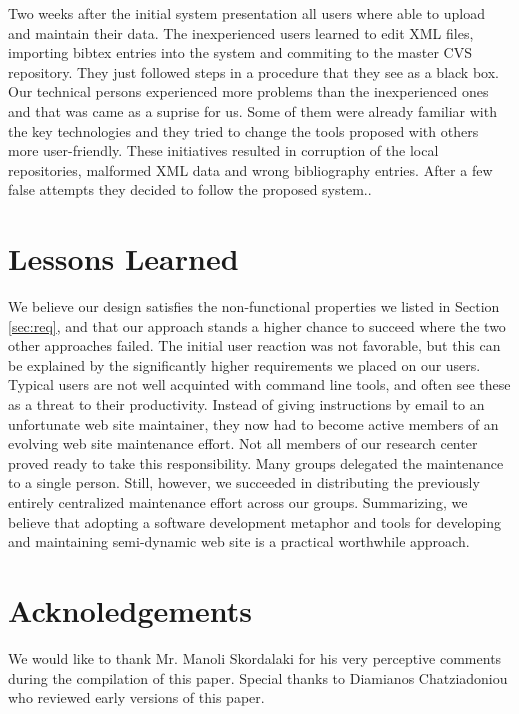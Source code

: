 \documentclass[10pt]{article}
\begin{document}
Two weeks after the initial system presentation all users where able to upload 
and maintain their data. The inexperienced users learned to edit XML files,
importing bibtex entries into the system and commiting to the master CVS repository. 
They just followed steps in a procedure that they see as a black box. 
Our technical persons experienced more problems than the inexperienced ones 
and that was came as a suprise for us. Some of them were already familiar 
with the key technologies and they tried to change the tools proposed with others more user-friendly. 
These initiatives resulted in corruption of the local repositories, malformed XML data and wrong bibliography entries.
After a few false attempts they decided to follow the proposed system..

\section{Lessons Learned}
\label{sec:concl}
We believe our design satisfies the non-functional properties
we listed in Section \ref{sec:req},
and that our approach stands a higher chance to succeed where the
two other approaches failed.
The initial user reaction was not favorable, but this can
be explained by the significantly higher requirements we
placed on our users. Typical users are not well acquinted
with command line tools, and often see these as a threat to their productivity.
Instead of giving instructions by email to an unfortunate
web site maintainer, they now had to become active members
of an evolving web site maintenance effort.
Not all members of our research center proved ready to take
this responsibility.
Many groups delegated the maintenance to a single person.
Still, however, we succeeded in distributing the previously
entirely centralized maintenance effort across our groups.
Summarizing, we believe that adopting a software development
metaphor and tools for developing and maintaining semi-dynamic
web site is a practical worthwhile approach.

\section{Acknoledgements}
\label{sec:ack}

We would like to thank Mr. Manoli Skordalaki for his very perceptive comments during the compilation of this paper.
Special thanks to Diamianos Chatziadoniou who reviewed early versions of this paper.



\end{document}
